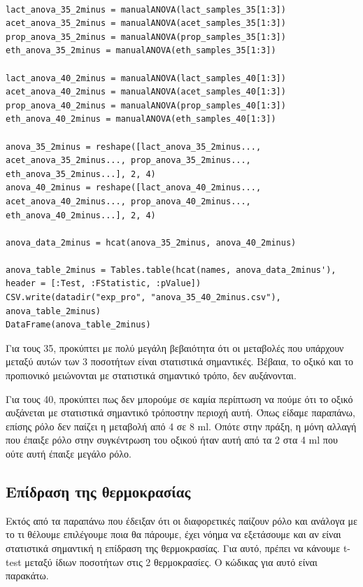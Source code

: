 \documentclass[11pt]{article}
\begin{document}
\begin{verbatim}

lact_anova_35_2minus = manualANOVA(lact_samples_35[1:3])
acet_anova_35_2minus = manualANOVA(acet_samples_35[1:3])
prop_anova_35_2minus = manualANOVA(prop_samples_35[1:3])
eth_anova_35_2minus = manualANOVA(eth_samples_35[1:3])

lact_anova_40_2minus = manualANOVA(lact_samples_40[1:3])
acet_anova_40_2minus = manualANOVA(acet_samples_40[1:3])
prop_anova_40_2minus = manualANOVA(prop_samples_40[1:3])
eth_anova_40_2minus = manualANOVA(eth_samples_40[1:3])

anova_35_2minus = reshape([lact_anova_35_2minus..., acet_anova_35_2minus..., prop_anova_35_2minus..., eth_anova_35_2minus...], 2, 4)
anova_40_2minus = reshape([lact_anova_40_2minus..., acet_anova_40_2minus..., prop_anova_40_2minus..., eth_anova_40_2minus...], 2, 4)

anova_data_2minus = hcat(anova_35_2minus, anova_40_2minus)

anova_table_2minus = Tables.table(hcat(names, anova_data_2minus'), header = [:Test, :FStatistic, :pValue])
CSV.write(datadir("exp_pro", "anova_35_40_2minus.csv"), anova_table_2minus)
DataFrame(anova_table_2minus)

\end{verbatim}

Για τους 35, προκύπτει με πολύ μεγάλη βεβαιότητα ότι οι μεταβολές που υπάρχουν μεταξύ αυτών των 3 ποσοτήτων είναι στατιστικά σημαντικές. Βέβαια, το οξικό και το προπιονικό μειώνονται με στατιστικά σημαντικό τρόπο, δεν αυξάνονται.

Για τους 40, προκύπτει πως δεν μπορούμε σε καμία περίπτωση να πούμε ότι το οξικό αυξάνεται με στατιστικά σημαντικό τρόποστην περιοχή αυτή. Όπως είδαμε παραπάνω, επίσης ρόλο δεν παίζει η μεταβολή από 4 σε 8 ml. Οπότε στην πράξη, η μόνη αλλαγή που έπαιξε ρόλο στην συγκέντρωση του οξικού ήταν αυτή από τα 2 στα 4 ml που ούτε αυτή έπαιξε μεγάλο ρόλο.

\subsection{Επίδραση της θερμοκρασίας}
\label{sec:orge1fd2de}
Εκτός από τα παραπάνω που έδειξαν ότι οι διαφορετικές παίζουν ρόλο και ανάλογα με το τι θέλουμε επιλέγουμε ποια θα πάρουμε, έχει νόημα να εξετάσουμε και αν είναι στατιστικά σημαντική η επίδραση της θερμοκρασίας. Για αυτό, πρέπει να κάνουμε t-test μεταξύ ίδιων ποσοτήτων στις 2 θερμοκρασίες. Ο κώδικας για αυτό είναι παρακάτω.
\end{document}
